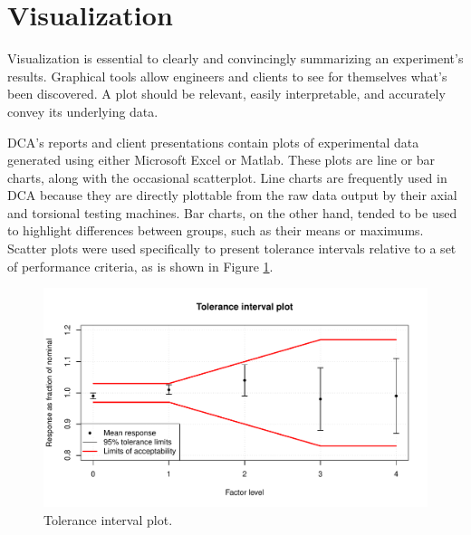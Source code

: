 \documentclass[11pt,a4paper,article]{memoir} %
\begin{document}
\newpage
\section{Visualization}
\label{sec:dca_vis}
Visualization is essential to clearly and convincingly summarizing an experiment's results. Graphical tools allow engineers and clients to see for themselves what's been discovered. A plot should be relevant, easily interpretable, and accurately convey its underlying data.
\par
DCA's reports and client presentations contain plots of experimental data generated using either Microsoft Excel or Matlab. These plots are line or bar charts, along with the occasional scatterplot. Line charts are frequently used in DCA because they are directly plottable from the raw data output by their axial and torsional testing machines. Bar charts, on the other hand, tended to be used to highlight differences between groups, such as their means or maximums. Scatter plots were used specifically to present tolerance intervals relative to a set of performance criteria, as is shown in Figure \ref{fig:tolerance_intervals_plot}.
\begin{figure}[h!]
	\includegraphics[width=\textwidth]{tolerance_intervals_plot.pdf}
	\caption{Tolerance interval plot.}
	\label{fig:tolerance_intervals_plot}
\end{figure}
\end{document}
